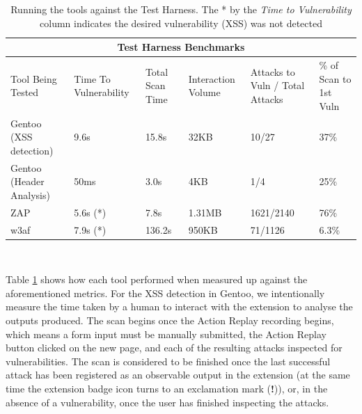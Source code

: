\begin{table}[h]
	
{

	   \captionsetup{justification=centering}
	
	\caption{Running the tools against the Test Harness. The * by the \textit{Time to Vulnerability} column indicates the desired vulnerability (XSS) was not detected}
		\label{table:test_harness_benchmarks}
\begin{tabular}{ |p{4cm}||p{1.4cm}|p{1.4cm}|p{1.6cm}|p{2cm}|p{2cm}| }
	\hline
	\multicolumn{6}{|c|}{\textbf{Test Harness Benchmarks}} \\ [0.5ex]
	\hline \hline 
	Tool Being Tested& Time To Vulnerability & Total Scan Time & Interaction Volume & Attacks to Vuln / Total Attacks & \% of Scan to 1st Vuln \\
	\hline
	Gentoo (XSS detection)    & 9.6s      & 15.8s    & 32KB & 10/27 &37\% \\
	Gentoo (Header Analysis) & 50ms    &  3.0s    & 4KB&  1/4 &25\%\\
	ZAP                                   & 5.6s (*) & 7.8s      &  1.31MB &1621/2140 &76\%\\ 
	w3af                                 & 7.9s  (*) & 136.2s & 950KB & 71/1126 &6.3\%\\
	\hline
\end{tabular}
} \\
\end{table}

Table \ref{table:test_harness_benchmarks} shows how each tool performed when measured up against the aforementioned metrics. For the XSS detection in Gentoo, we intentionally measure the time taken by a human to interact with the extension to analyse the outputs produced. The scan begins once the Action Replay recording begins, which means a form input must be manually submitted, the Action Replay button clicked on the new page, and each of the resulting attacks inspected for vulnerabilities. The scan is considered to be finished once the last successful attack has been registered as an observable output in the extension (at the same time the extension badge icon turns to an exclamation mark (\textbf{!})), or, in the absence of a vulnerability, once the user has finished inspecting the attacks. \\

